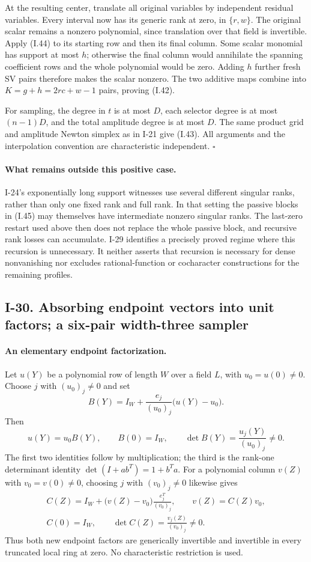 At the resulting center, translate all original variables
by independent residual variables.  Every interval now
has its generic rank at zero, in $\{r,w\}$.  The original
scalar remains a nonzero polynomial, since translation
over that field is invertible.  Apply (I.44) to its starting
row and then its final column.  Some scalar monomial has
support at most $h$; otherwise the final column would
annihilate the spanning coefficient rows and the whole
polynomial would be zero.  Adding $h$ further fresh SV pairs
therefore makes the scalar nonzero.  The two additive maps
combine into $K=g+h=2rc+w-1$ pairs, proving (I.42).

For sampling, the degree in $t$ is at most $D$, each selector
degree is at most $(n-1)D$, and the total amplitude degree
is at most $D$.  The same product grid and amplitude Newton
simplex as in I-21 give (I.43).  All arguments and the
interpolation convention are characteristic independent.
\hfill$\square$

\paragraph{What remains outside this positive case.}
I-24's exponentially long support witnesses use several
different singular ranks, rather than only one fixed rank
and full rank.  In that setting the passive blocks in
(I.45) may themselves have intermediate nonzero singular
ranks.  The last-zero restart used above then does not
replace the whole passive block, and recursive rank losses
can accumulate.  I-29 identifies a precisely proved regime
where this recursion is unnecessary.  It neither asserts
that recursion is necessary for dense nonvanishing nor
excludes rational-function or cocharacter constructions
for the remaining profiles.


\subsection{I-30. Absorbing endpoint vectors into unit factors; a six-pair width-three sampler}
\label{I-30}

\paragraph{An elementary endpoint factorization.}
Let $u(Y)$ be a polynomial row of length $W$ over a field $L$,
with $u_0=u(0)\ne0$.  Choose $j$ with $(u_0)_j\ne0$ and set
\[
 B(Y)=I_W+\frac{e_j}{(u_0)_j}\bigl(u(Y)-u_0\bigr).
 \tag{I.46}
\]
Then
\[
 u(Y)=u_0B(Y),\qquad B(0)=I_W,\qquad
 \det B(Y)=\frac{u_j(Y)}{(u_0)_j}\ne0.
\]
The first two identities follow by multiplication; the third
is the rank-one determinant identity
$\det(I+ab^T)=1+b^Ta$.
For a polynomial column $v(Z)$ with $v_0=v(0)\ne0$, choosing
$j$ with $(v_0)_j\ne0$ likewise gives
\[
 \begin{gathered}
 C(Z)=I_W+\bigl(v(Z)-v_0\bigr)\frac{e_j^T}{(v_0)_j},
 \qquad v(Z)=C(Z)v_0,\\
 C(0)=I_W,
 \qquad \det C(Z)=\frac{v_j(Z)}{(v_0)_j}\ne0.
 \end{gathered}
 \tag{I.47}
\]
Thus both new endpoint factors are generically invertible and
invertible in every truncated local ring at zero.  No
characteristic restriction is used.

